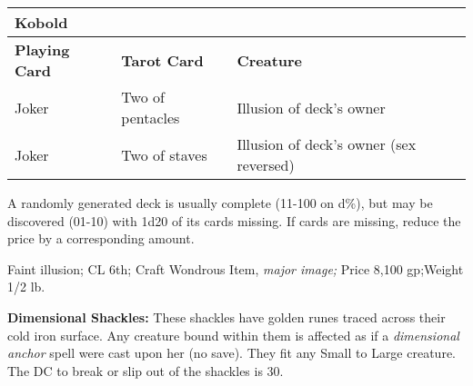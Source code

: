 \begin{longtable}{llllll}
{\begin{minipage}[t]{2.191in}
Kobold\end{minipage}}\\
\hline
\multicolumn{1}{|p{1.102in}|}{\begin{minipage}[t]{1.102in}\raggedright
\textbf{Playing Card}\end{minipage}} & \multicolumn{1}{p{1.207in}|}{\begin{minipage}[t]{1.207in}\raggedright
\textbf{Tarot Card}\end{minipage}} & \multicolumn{4}{p{2.191in}|}{\begin{minipage}[t]{2.191in}\raggedright
\textbf{Creature}\end{minipage}}\\
\hline
\multicolumn{1}{|p{1.102in}|}{\begin{minipage}[t]{1.102in}\raggedright
Joker\end{minipage}} & \multicolumn{1}{p{1.207in}|}{\begin{minipage}[t]{1.207in}\raggedright
Two of pentacles\end{minipage}} & \multicolumn{4}{p{2.191in}|}{\begin{minipage}[t]{2.191in}\raggedright
Illusion of deck's owner\end{minipage}}\\
\hline
\multicolumn{1}{|p{1.102in}|}{\begin{minipage}[t]{1.102in}\raggedright
Joker\end{minipage}} & \multicolumn{1}{p{1.207in}|}{\begin{minipage}[t]{1.207in}\raggedright
Two of staves\end{minipage}} & \multicolumn{4}{p{2.191in}|}{\begin{minipage}[t]{2.191in}\raggedright
Illusion of deck's owner (sex reversed)\end{minipage}}\\
\hline
\end{longtable}

A randomly generated deck is usually complete (11-100 on d\%), but may be discovered 
(01-10) with 1d20 of its cards missing. If cards are missing, reduce the price 
by a corresponding amount.

Faint illusion; CL 6th; Craft Wondrous Item, \textit{major image; }Price 8,100 
gp;Weight 1/2 lb.

\textbf{Dimensional Shackles:} These shackles have golden runes traced across their 
cold iron surface. Any creature bound within them is affected as if a \textit{dimensional 
anchor }spell were cast upon her (no save). They fit any Small to Large creature. 
The DC to break or slip out of the shackles is 30.


